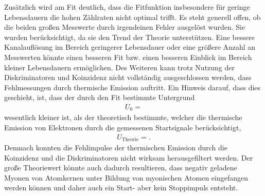 Zusätzlich wird am Fit deutlich, dass die Fitfunktion insbesondere für geringe Lebensdauern die hohen Zählraten nicht optimal trifft.
Es steht generell offen, ob die beiden großen Messwerte durch irgendeinen Fehler ausgelöst wurden.
Sie wurden berücksichtigt, da sie den Trend der Theorie unterstützen.
Eine bessere Kanalauflösung im Bereich geringerer Lebensdauer oder eine größere Anzahl an Messwerten könnte einen besseren Fit bzw. einen besseren Einblick im Bereich kleiner Lebensdauern ermöglichen.
Des Weiteren kann trotz Nutzung der Diskriminatoren und Koinzidenz nicht vollständig ausgeschlossen werden, dass Fehlmessungen durch thermische Emission auftritt. %
Ein Hinweis darauf, dass dies geschieht, ist, dass der durch den Fit bestimmte Untergrund
\begin{align*}
  U_0 = 
\end{align*}
wesentlich kleiner ist, als der theoretisch bestimmte, welcher die thermische Emission von Elektronen durch die gemessenen Startsignale berücksichtigt,
\begin{align*}
  U_{\text{Theorie}} = .
\end{align*}
Demnach konnten die Fehlimpulse der thermischen Emission durch die Koinzidenz und die Diskriminatoren nicht wirksam herausgefiltert werden.
Der große Theoriewert könnte auch dadurch resultieren, dass negativ geladene Myonen von Atomkernen unter Bildung von myonischen Atomen eingefangen werden können und daher auch ein Start- aber kein Stoppimpuls entsteht.
